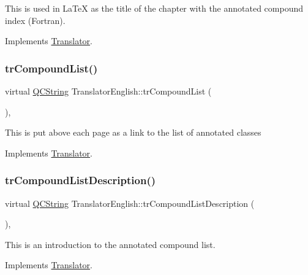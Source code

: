 This is used in La\+TeX as the title of the chapter with the annotated compound index (Fortran). 

Implements \mbox{\hyperlink{class_translator}{Translator}}.

\mbox{\label{class_translator_english_a83895827a9e6152ed52a5deab4054998}} 
\subsubsection{\texorpdfstring{trCompoundList()}{trCompoundList()}}
{\footnotesize\ttfamily virtual \mbox{\hyperlink{class_q_c_string}{Q\+C\+String}} Translator\+English\+::tr\+Compound\+List (\begin{DoxyParamCaption}{ }\end{DoxyParamCaption})\hspace{0.3cm}{\ttfamily [inline]}, {\ttfamily [virtual]}}

This is put above each page as a link to the list of annotated classes 

Implements \mbox{\hyperlink{class_translator}{Translator}}.

\mbox{\label{class_translator_english_aa78b4d079367bbec4a7cd8d93d87c4a5}} 
\subsubsection{\texorpdfstring{trCompoundListDescription()}{trCompoundListDescription()}}
{\footnotesize\ttfamily virtual \mbox{\hyperlink{class_q_c_string}{Q\+C\+String}} Translator\+English\+::tr\+Compound\+List\+Description (\begin{DoxyParamCaption}{ }\end{DoxyParamCaption})\hspace{0.3cm}{\ttfamily [inline]}, {\ttfamily [virtual]}}

This is an introduction to the annotated compound list. 

Implements \mbox{\hyperlink{class_translator}{Translator}}.

\mbox{\label{class_translator_english_a8ffb639127fc5a60e170fe4916d5e10c}} 
